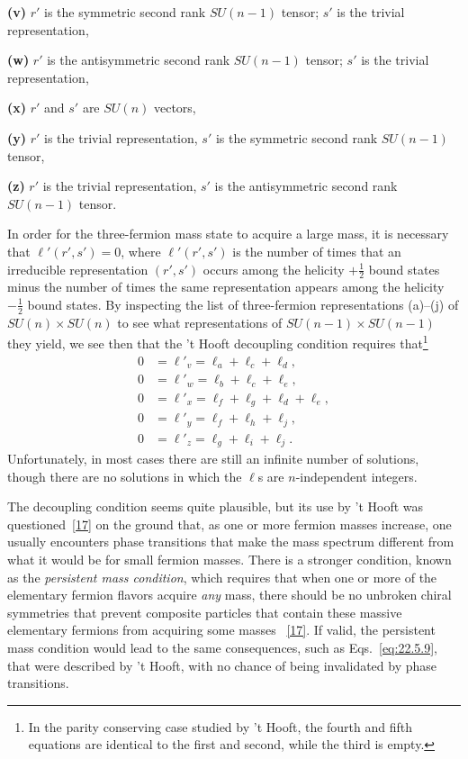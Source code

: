 \medskip
\noindent\textbf{(v)} $r'$ is the symmetric second rank $SU(n-1)$ tensor;
$s'$ is the trivial representation,

\noindent\textbf{(w)} $r'$ is the antisymmetric second rank $SU(n-1)$
tensor; $s'$ is the trivial representation,

\noindent\textbf{(x)} $r'$ and $s'$ are $SU(n)$ vectors,

\noindent\textbf{(y)} $r'$ is the trivial representation, $s'$ is the
symmetric second rank $SU(n-1)$ tensor,

\noindent\textbf{(z)} $r'$ is the trivial representation, $s'$ is the
antisymmetric second rank $SU(n-1)$ tensor.
\medskip

In order for the three-fermion mass state to acquire a large mass, it is
necessary that $\ell'(r',s')=0$, where $\ell'(r',s')$ is the number of
times that an irreducible representation $(r',s')$ occurs among the
helicity $+\frac12$ bound states minus the number of times the same
representation appears among the helicity $-\frac12$ bound states. By
inspecting the list of three-fermion representations (a)--(j) of
$SU(n)\times SU(n)$ to see what representations of
$SU(n-1)\times SU(n-1)$ they yield, we see then that the 't Hooft
decoupling condition requires that\footnote{In the parity conserving case
studied by 't Hooft, the fourth and fifth equations are identical to the
first and second, while the third is empty.}
\begin{equation}
 \begin{aligned}
 0&=\ell'_v=\ell_a+\ell_c+\ell_d,\\
 0&=\ell'_w=\ell_b+\ell_c+\ell_e,\\
 0&=\ell'_x=\ell_f+\ell_g+\ell_d+\ell_e,\\
 0&=\ell'_y=\ell_f+\ell_h+\ell_j,\\
 0&=\ell'_z=\ell_g+\ell_i+\ell_j.
 \end{aligned}
 \tag{22.5.9}\label{eq:22.5.9}
\end{equation}
Unfortunately, in most cases there are still an infinite number of
solutions, though there are no solutions in which the $\ell$s are
$n$-independent integers.

The decoupling condition seems quite plausible, but its use by 't Hooft was
questioned~\hyperref[ch22-ref-17]{[17]} on the ground that, as one or more
fermion masses increase, one usually encounters phase transitions that
make the mass spectrum different from what it would be for small fermion
masses. There is a stronger condition, known as the \emph{persistent mass
condition}, which requires that when one or more of the elementary fermion
flavors acquire \emph{any} mass, there should be no unbroken chiral
symmetries that prevent composite particles that contain these massive
elementary fermions from acquiring some masses~%
\hyperref[ch22-ref-17]{[17]}. If valid, the persistent mass condition would
lead to the same consequences, such as Eqs.~\eqref{eq:22.5.9}, that were
described by 't Hooft, with no chance of being invalidated by phase
transitions.

